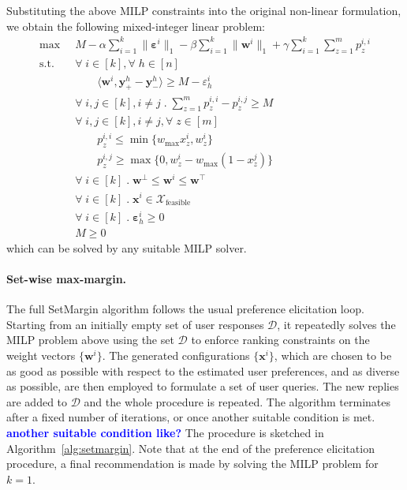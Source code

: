\documentclass{article}
\renewcommand\[{\begin{equation}}
\renewcommand\]{\end{equation}}
\newcommand{\calvar}[1]{\ensuremath{\mathcal{#1}}}
\newcommand{\calD}{\calvar{D}}
\newcommand{\calX}{\calvar{X}}
\newcommand{\vecvar}[1]{\ensuremath{\boldsymbol{#1}}}
\newcommand{\vw}{\vecvar{w}}
\newcommand{\vx}{\vecvar{x}}
\newcommand{\vy}{\vecvar{y}}
\newcommand{\veps}{\vecvar{\varepsilon}}
\newcommand{\andrea}[1]{{\bf \textcolor{blue}{{\fbox{Andrea:} #1}}}}
\begin{document}
Substituting the above MILP constraints into the original non-linear
formulation, we obtain the following mixed-integer linear problem:
%
{\footnotesize
\begin{align}
    \max
        & \;\; M - \alpha \sum_{i=1}^k \| \veps^{i} \|_1 - \beta \sum_{i=1}^k \| \vw^{i} \|_1 + \gamma \sum_{i=1}^k \sum_{z=1}^m p^{i,i}_z
        \nonumber
    \\
    \text{s.t.}
        & \;\; \forall \; i \in [k], \forall \; h \in [n] \nonumber
    \\
        & \;\; \qquad \langle \vw^{i}, \vy^{h}_+ - \vy^{h}_- \rangle \ge M - \varepsilon^{i}_h \nonumber
    \\
        & \;\; \forall \; i, j \in [k], i \neq j \;.\; \sum_{z=1}^m p^{i,i}_z - p^{i,j}_z \ge M
    \\
        & \;\; \forall \; i, j \in [k], i \neq j, \forall \; z \in [m] \nonumber
    \\
        & \;\; \qquad p^{i,i}_z \le \min \{ w_\text{max} x^{i}_z, w^{i}_z \}
    \\
        & \;\; \qquad p^{i,j}_z \ge \max \{ 0, w^{i}_z - w_\text{max}(1 - x^{j}_z) \}
    \\
        & \;\; \forall \; i \in [k] \;.\; \vw^\bot \le \vw^{i} \le \vw^\top \label{eq:wbounds2}
    \\
        & \;\; \forall \; i \in [k] \;.\; \vx^{i} \in \calX_{\text{feasible}} \nonumber
    \\
        & \;\; \forall \; i \in [k] \;.\; \veps^{i}_h \ge 0 \nonumber
    \\
        & \;\; M \ge 0 \nonumber
\end{align}
}
%
which can be solved by any suitable MILP solver.

\paragraph{Set-wise max-margin.} The full {\sc SetMargin} algorithm
follows the usual preference elicitation loop. Starting from an
initially empty set of user responses $\calD$, it repeatedly solves
the MILP problem above using the set $\calD$ to enforce ranking
constraints on the weight vectors $\{\vw^i\}$. The generated
configurations $\{\vx^i\}$, which are chosen to be as good as possible
with respect to the estimated user preferences, and as diverse as
possible, are then employed to formulate a set of user queries. The
new replies are added to $\calD$ and the whole procedure is
repeated. The algorithm terminates after a fixed number of iterations,
or once another suitable condition is met. \andrea{another suitable
  condition like?}  The procedure is sketched in
Algorithm~\ref{alg:setmargin}. Note that at the end of the preference
elicitation procedure, a final recommendation is made by solving the
MILP problem for $k=1$.
\end{document}
